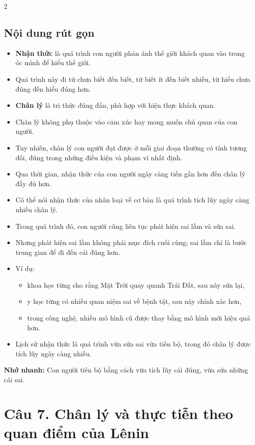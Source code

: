 \documentclass[9pt,a4paper]{extarticle}
\begin{document}
\begin{multicols*}{2}
\subsection*{Nội dung rút gọn}
\begin{itemize}
  \item \textbf{Nhận thức} là quá trình con người phản ánh thế giới khách quan vào trong óc mình để hiểu thế giới.
  \item Quá trình này đi từ chưa biết đến biết, từ biết ít đến biết nhiều, từ hiểu chưa đúng đến hiểu đúng hơn.
  \item \textbf{Chân lý} là tri thức đúng đắn, phù hợp với hiện thực khách quan.
  \item Chân lý không phụ thuộc vào cảm xúc hay mong muốn chủ quan của con người.
  \item Tuy nhiên, chân lý con người đạt được ở mỗi giai đoạn thường có tính tương đối, đúng trong những điều kiện và phạm vi nhất định.
  \item Qua thời gian, nhận thức của con người ngày càng tiến gần hơn đến chân lý đầy đủ hơn.
  \item Có thể nói nhận thức của nhân loại về cơ bản là quá trình tích lũy ngày càng nhiều chân lý.
  \item Trong quá trình đó, con người cũng liên tục phát hiện sai lầm và sửa sai.
  \item Nhưng phát hiện sai lầm không phải mục đích cuối cùng; sai lầm chỉ là bước trung gian để đi đến cái đúng hơn.
  \item Ví dụ:
  \begin{itemize}
    \item khoa học từng cho rằng Mặt Trời quay quanh Trái Đất, sau này sửa lại,
    \item y học từng có nhiều quan niệm sai về bệnh tật, sau này chính xác hơn,
    \item trong công nghệ, nhiều mô hình cũ được thay bằng mô hình mới hiệu quả hơn.
  \end{itemize}
  \item Lịch sử nhận thức là quá trình vừa sửa sai vừa tiến bộ, trong đó chân lý được tích lũy ngày càng nhiều.
\end{itemize}

\textbf{Nhớ nhanh:} Con người tiến bộ bằng cách vừa tích lũy cái đúng, vừa sửa những cái sai.

\section*{Câu 7. Chân lý và thực tiễn theo quan điểm của Lênin}

\end{multicols*}
\end{document}
